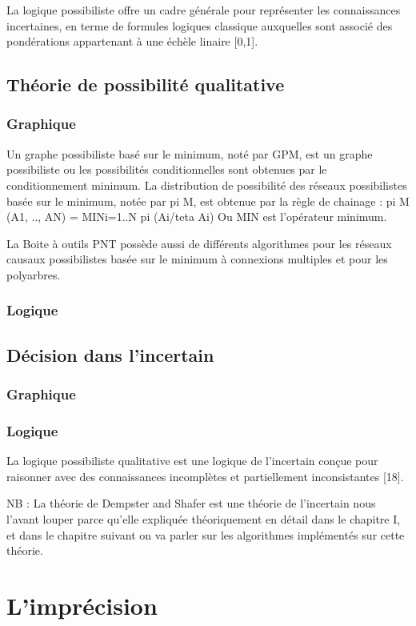 La logique possibiliste offre un cadre générale pour représenter les connaissances incertaines, en terme de formules logiques classique auxquelles sont associé des pondérations appartenant à une échèle linaire [0,1].
\subsection{Théorie de possibilité qualitative}
\subsubsection{Graphique}

Un graphe possibiliste basé sur le minimum, noté par GPM, est un graphe possibiliste ou les possibilités conditionnelles sont obtenues par le conditionnement minimum. La distribution de possibilité des réseaux possibilistes basée sur le minimum, notée par pi M, est obtenue par la règle de chainage :
 pi M (A1, .., AN) = MINi=1..N pi (Ai/teta Ai) 
Ou MIN est  l’opérateur minimum.

La Boite à outils PNT possède aussi de différents algorithmes pour les réseaux causaux possibilistes basée sur le minimum à connexions multiples et pour les polyarbres. 
\subsubsection{Logique}



\subsection{Décision dans l’incertain}
\subsubsection{Graphique}

\subsubsection{Logique}
La logique possibiliste qualitative est une logique de l'incertain conçue pour raisonner avec des connaissances incomplètes et partiellement inconsistantes [18].

NB : La théorie de Dempster and Shafer  est une théorie de l’incertain nous l’avant louper parce qu’elle expliquée théoriquement en détail dans le chapitre I, et dans le chapitre suivant on va parler sur les algorithmes implémentés sur cette théorie.
\section{L’imprécision}

